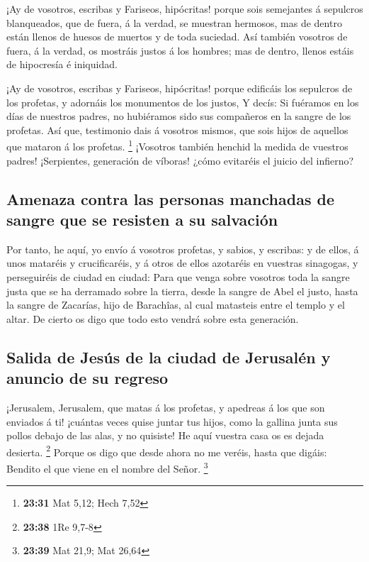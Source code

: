  ¡Ay de vosotros, escribas y Fariseos, hipócritas! porque
sois semejantes á sepulcros blanqueados, que de fuera, á la verdad, se
muestran hermosos, mas de dentro están llenos de huesos de muertos y de
toda suciedad.  Así también vosotros de fuera, á la verdad,
os mostráis justos á los hombres; mas de dentro, llenos estáis de
hipocresía é iniquidad.

 ¡Ay de vosotros, escribas y Fariseos, hipócritas! porque
edificáis los sepulcros de los profetas, y adornáis los monumentos de
los justos,  Y decís: Si fuéramos en los días de nuestros
padres, no hubiéramos sido sus compañeros en la sangre de los profetas.
 Así que, testimonio dais á vosotros mismos, que sois hijos
de aquellos que mataron á los profetas. \footnote{\textbf{23:31} Mat
  5,12; Hech 7,52}  ¡Vosotros también henchid la medida de
vuestros padres!  ¡Serpientes, generación de víboras! ¿cómo
evitaréis el juicio del infierno?

\hypertarget{amenaza-contra-las-personas-manchadas-de-sangre-que-se-resisten-a-su-salvaciuxf3n}{%
\subsection{Amenaza contra las personas manchadas de sangre que se
resisten a su
salvación}\label{amenaza-contra-las-personas-manchadas-de-sangre-que-se-resisten-a-su-salvaciuxf3n}}

 Por tanto, he aquí, yo envío á vosotros profetas, y
sabios, y escribas: y de ellos, á unos mataréis y crucificaréis, y á
otros de ellos azotaréis en vuestras sinagogas, y perseguiréis de ciudad
en ciudad:  Para que venga sobre vosotros toda la sangre
justa que se ha derramado sobre la tierra, desde la sangre de Abel el
justo, hasta la sangre de Zacarías, hijo de Barachîas, al cual matasteis
entre el templo y el altar.  De cierto os digo que todo
esto vendrá sobre esta generación.

\hypertarget{salida-de-jesuxfas-de-la-ciudad-de-jerusaluxe9n-y-anuncio-de-su-regreso}{%
\subsection{Salida de Jesús de la ciudad de Jerusalén y anuncio de su
regreso}\label{salida-de-jesuxfas-de-la-ciudad-de-jerusaluxe9n-y-anuncio-de-su-regreso}}

 ¡Jerusalem, Jerusalem, que matas á los profetas, y
apedreas á los que son enviados á ti! ¡cuántas veces quise juntar tus
hijos, como la gallina junta sus pollos debajo de las alas, y no
quisiste!  He aquí vuestra casa os es dejada desierta.
\footnote{\textbf{23:38} 1Re 9,7-8}  Porque os digo que
desde ahora no me veréis, hasta que digáis: Bendito el que viene en el
nombre del Señor. \footnote{\textbf{23:39} Mat 21,9; Mat 26,64}

